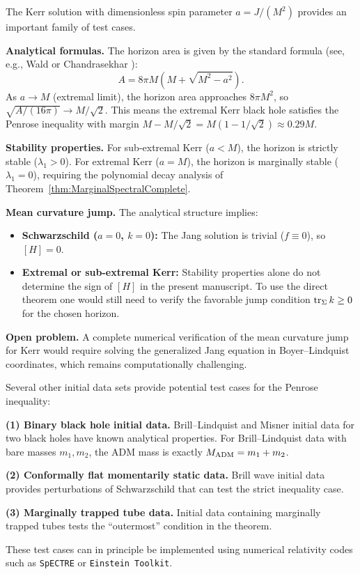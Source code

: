 \begin{remark}\label{rem:KerrAnalysis}
The Kerr solution with dimensionless spin parameter $a = J/(M^2)$ provides an important family of test cases.

\textbf{Analytical formulas.} The horizon area is given by the standard formula (see, e.g., Wald \cite[Eq.~12.3.5]{wald1984} or Chandrasekhar \cite[\S 58]{chandrasekhar1983}):
\begin{equation}
    A = 8\pi M(M + \sqrt{M^2 - a^2}).
\end{equation}
As $a \to M$ (extremal limit), the horizon area approaches $8\pi M^2$, so $\sqrt{A/(16\pi)} \to M/\sqrt{2}$. This means the extremal Kerr black hole satisfies the Penrose inequality with margin $M - M/\sqrt{2} = M(1 - 1/\sqrt{2}) \approx 0.29M$.

\textbf{Stability properties.} For sub-extremal Kerr ($a < M$), the horizon is strictly stable ($\lambda_1 > 0$). For extremal Kerr ($a = M$), the horizon is marginally stable ($\lambda_1 = 0$), requiring the polynomial decay analysis of Theorem~\ref{thm:MarginalSpectralComplete}.

\textbf{Mean curvature jump.} The analytical structure implies:
\begin{itemize}
    \item \textbf{Schwarzschild ($a = 0$, $k = 0$):} The Jang solution is trivial ($f \equiv 0$), so $[H] = 0$.
    \item \textbf{Extremal or sub-extremal Kerr:} Stability properties alone do not determine the sign of $[H]$ in the present manuscript. To use the direct theorem one would still need to verify the favorable jump condition $\operatorname{tr}_\Sigma k \ge 0$ for the chosen horizon.
\end{itemize}

\textbf{Open problem.} A complete numerical verification of the mean curvature jump for Kerr would require solving the generalized Jang equation in Boyer--Lindquist coordinates, which remains computationally challenging.
\end{remark}

\begin{remark}\label{rem:OtherTestCases}
Several other initial data sets provide potential test cases for the Penrose inequality:

\textbf{(1) Binary black hole initial data.} Brill--Lindquist and Misner initial data for two black holes have known analytical properties. For Brill--Lindquist data with bare masses $m_1, m_2$, the ADM mass is exactly $M_{\mathrm{ADM}} = m_1 + m_2$.

\textbf{(2) Conformally flat momentarily static data.} Brill wave initial data provides perturbations of Schwarzschild that can test the strict inequality case.

\textbf{(3) Marginally trapped tube data.} Initial data containing marginally trapped tubes tests the ``outermost'' condition in the theorem.

These test cases can in principle be implemented using numerical relativity codes such as \texttt{SpECTRE} or \texttt{Einstein Toolkit}.
\end{remark}

